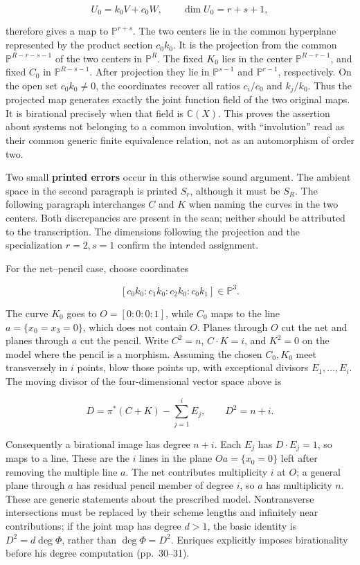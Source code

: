 \[
U_0=k_0V+c_0W,\qquad \dim U_0=r+s+1,
\]

therefore gives a map to \(\mathbb P^{r+s}\). The two centers lie in the common hyperplane represented by the product section \(c_0k_0\). It is the projection from the common \(\mathbb P^{R-r-s-1}\) of the two centers in \(\mathbb P^R\). The fixed \(K_0\) lies in the center \(\mathbb P^{R-r-1}\), and fixed \(C_0\) in \(\mathbb P^{R-s-1}\). After projection they lie in \(\mathbb P^{s-1}\) and \(\mathbb P^{r-1}\), respectively. On the open set \(c_0k_0\ne0\), the coordinates recover all ratios \(c_i/c_0\) and \(k_j/k_0\). Thus the projected map generates exactly the joint function field of the two original maps. It is birational precisely when that field is \(\mathbb C(X)\). This proves the assertion about systems not belonging to a common involution, with ``involution'' read as their common generic finite equivalence relation, not as an automorphism of order two.

Two small \textbf{printed errors} occur in this otherwise sound argument. The ambient space in the second paragraph is printed \(S_r\), although it must be \(S_R\). The following paragraph interchanges \(C\) and \(K\) when naming the curves in the two centers. Both discrepancies are present in the scan; neither should be attributed to the transcription. The dimensions following the projection and the specialization \(r=2,s=1\) confirm the intended assignment.

For the net--pencil case, choose coordinates

\[
[c_0k_0:c_1k_0:c_2k_0:c_0k_1]\in\mathbb P^3.
\]

The curve \(K_0\) goes to \(O=[0:0:0:1]\), while \(C_0\) maps to the line \(a=\{x_0=x_3=0\}\), which does not contain \(O\). Planes through \(O\) cut the net and planes through \(a\) cut the pencil. Write \(C^2=n\), \(C\cdot K=i\), and \(K^2=0\) on the model where the pencil is a morphism. Assuming the chosen \(C_0,K_0\) meet transversely in \(i\) points, blow those points up, with exceptional divisors \(E_1,\ldots,E_i\). The moving divisor of the four-dimensional vector space above is

\[
D=\pi^*(C+K)-\sum_{j=1}^{i}E_j,\qquad
D^2=n+i.
\]

Consequently a birational image has degree \(n+i\). Each \(E_j\) has \(D\cdot E_j=1\), so maps to a line. These are the \(i\) lines in the plane \(Oa=\{x_0=0\}\) left after removing the multiple line \(a\). The net contributes multiplicity \(i\) at \(O\); a general plane through \(a\) has residual pencil member of degree \(i\), so \(a\) has multiplicity \(n\). These are generic statements about the prescribed model. Nontransverse intersections must be replaced by their scheme lengths and infinitely near contributions; if the joint map has degree \(d>1\), the basic identity is \(D^2=d\deg\Phi\), rather than \(\deg\Phi=D^2\). Enriques explicitly imposes birationality before his degree computation (pp.~30--31).


